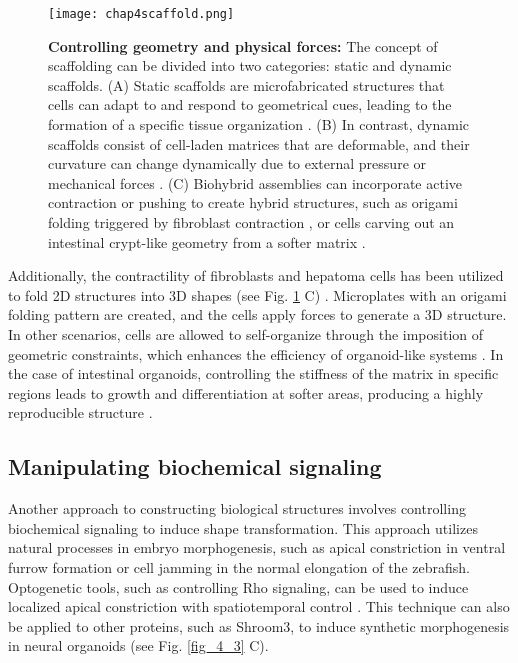 \begin{figure}
\centering
\texttt{[image: chap4scaffold.png]}
\caption{\label{fig_4_2}\textbf{Controlling geometry and physical forces: } The concept of scaffolding can be divided into two categories: static and dynamic scaffolds. (A) Static scaffolds are microfabricated structures that cells can adapt to and respond to geometrical cues, leading to the formation of a specific tissue organization \cite{brassard2021}. (B) In contrast, dynamic scaffolds consist of cell-laden matrices that are deformable, and their curvature can change dynamically due to external pressure or mechanical forces \cite{blonski2021, chan2018}. (C) Biohybrid assemblies can incorporate active contraction or pushing to create hybrid structures, such as origami folding triggered by fibroblast contraction \cite{he2018}, or cells carving out an intestinal crypt-like geometry from a softer matrix \cite{gjorevski2016}.}
\end{figure}

Additionally, the contractility of fibroblasts and hepatoma cells has been utilized to fold 2D structures into 3D shapes \cite{he2018} (see Fig. \ref{fig_4_2} C) . Microplates with an origami folding pattern are created, and the cells apply forces to generate a 3D structure. In other scenarios, cells are allowed to self-organize through the imposition of geometric constraints, which enhances the efficiency of organoid-like systems \cite{gjorevski2016}. In the case of intestinal organoids, controlling the stiffness of the matrix in specific regions leads to growth and differentiation at softer areas, producing a highly reproducible structure \cite{gjorevski2022}.

\hypertarget{manipulating-biochemical-signaling}{%
	\subsection{Manipulating biochemical signaling}\label{manipulating-biochemical-signaling}}

Another approach to constructing biological structures involves controlling biochemical signaling to induce shape transformation. This approach utilizes natural processes in embryo morphogenesis, such as apical constriction in ventral furrow formation or cell jamming in the normal elongation of the zebrafish. Optogenetic tools, such as controlling Rho signaling, can be used to induce localized apical constriction with spatiotemporal control \cite{izquierdo2018}. This technique can also be applied to other proteins, such as Shroom3, to induce synthetic morphogenesis in neural organoids \cite{martinez-ara2022} (see Fig. \ref{fig_4_3} C).

